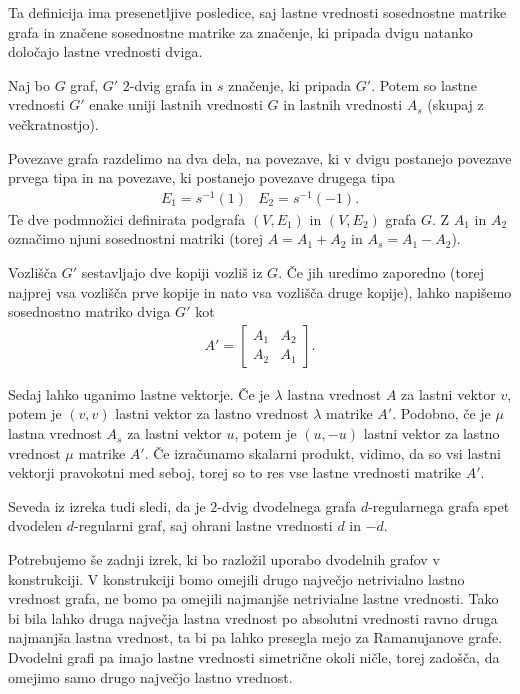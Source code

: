 Ta definicija ima presenetljive posledice, saj lastne vrednosti sosednostne matrike grafa in značene sosednostne matrike za značenje, ki pripada dvigu natanko določajo lastne vrednosti dviga\cite{bilu2004constructingexpandergraphs2lifts}.
\begin{izrek}
    Naj bo \(G\) graf, \(G'\) \(2\)-dvig grafa in \(s\) značenje, ki pripada \(G'\). Potem so lastne vrednosti \(G'\) enake uniji lastnih vrednosti \(G\) in lastnih vrednosti \(A_s\) (skupaj z večkratnostjo).
\end{izrek}
\begin{dokaz}
    Povezave grafa razdelimo na dva dela, na povezave, ki v dvigu postanejo povezave prvega tipa in na povezave, ki postanejo povezave drugega tipa
    \begin{align*}
        E_1 = s^{-1}(1) & E_2 = s^{-1}(-1).
    \end{align*}
    Te dve podmnožici definirata podgrafa \((V, E_1)\) in \((V, E_2)\) grafa \(G\). Z \(A_1\) in \(A_2\) označimo njuni sosednostni matriki (torej \(A = A_1 + A_2\) in \(A_s = A_1 - A_2\)).

    Vozlišča \(G'\) sestavljajo dve kopiji vozliš iz \(G\). Če jih uredimo zaporedno (torej najprej vsa vozlišča prve kopije in nato vsa vozlišča druge kopije), lahko napišemo sosednostno matriko dviga \(G'\) kot
    \begin{align*}
        A' = \begin{bmatrix}
                 A_1 & A_2 \\
                 A_2 & A_1
             \end{bmatrix}.
    \end{align*}

    Sedaj lahko uganimo lastne vektorje. Če je \(\lambda\) lastna vrednost \(A\) za lastni vektor \(v\), potem je \((v, v)\) lastni vektor za lastno vrednost \(\lambda\) matrike \(A'\). Podobno, če je \(\mu\) lastna vrednost \(A_s\) za lastni vektor \(u\), potem je \((u, -u)\) lastni vektor za lastno vrednost \(\mu\) matrike \(A'\). Če izračunamo skalarni produkt, vidimo, da so vsi lastni vektorji pravokotni med seboj, torej so to res vse lastne vrednosti matrike \(A'\).
\end{dokaz}
Seveda iz izreka tudi sledi, da je \(2\)-dvig dvodelnega grafa \(d\)-regularnega grafa spet dvodelen \(d\)-regularni graf, saj ohrani lastne vrednosti \(d\) in \(-d\).

Potrebujemo še zadnji izrek, ki bo razložil uporabo dvodelnih grafov v konstrukciji. V konstrukciji bomo omejili drugo največjo netrivialno lastno vrednost grafa, ne bomo pa omejili najmanjše netrivialne lastne vrednosti. Tako bi bila lahko druga največja lastna vrednost po absolutni vrednosti ravno druga najmanjša lastna vrednost, ta bi pa lahko presegla mejo za Ramanujanove grafe. Dvodelni grafi pa imajo lastne vrednosti simetrične okoli ničle, torej zadošča, da omejimo samo drugo največjo lastno vrednost\cite{godsil}.

